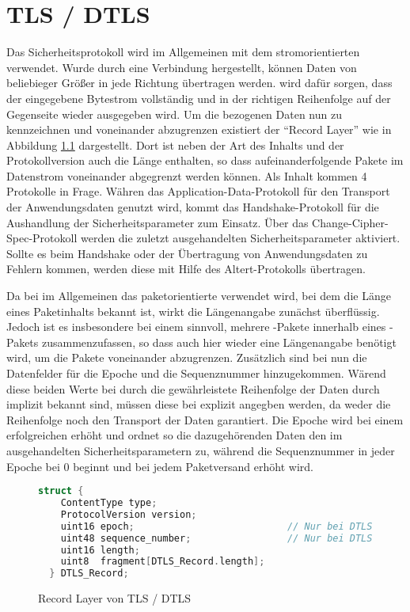 \chapter{TLS / DTLS}

Das Sicherheitsprotokoll  wird im Allgemeinen mit dem stromorientierten  verwendet.
Wurde durch  eine Verbindung hergestellt, können Daten von beliebieger Größer in jede Richtung
übertragen werden.  wird dafür sorgen, dass der eingegebene Bytestrom vollständig und in der
richtigen Reihenfolge auf der Gegenseite wieder ausgegeben wird. Um die  bezogenen Daten nun
zu kennzeichnen und voneinander abzugrenzen existiert der "`Record Layer"' wie in Abbildung \ref{fig:recordlayer}
dargestellt. Dort ist neben der Art des Inhalts und der Protokollversion auch die Länge enthalten, so dass
aufeinanderfolgende Pakete im Datenstrom voneinander abgegrenzt werden können. Als Inhalt kommen 4 Protokolle
in Frage. Währen das Application-Data-Protokoll für den Transport der Anwendungsdaten genutzt wird, kommt
das Handshake-Protokoll für die Aushandlung der Sicherheitsparameter zum Einsatz. Über das Change-Cipher-Spec-Protokoll
werden die zuletzt ausgehandelten Sicherheitsparameter aktiviert. Sollte es beim Handshake oder der Übertragung
von Anwendungsdaten zu Fehlern kommen, werden diese mit Hilfe des Altert-Protokolls übertragen.

Da bei  im Allgemeinen das paketorientierte  verwendet wird, bei dem die Länge eines
Paketinhalts bekannt ist, wirkt die Längenangabe zunächst überflüssig. Jedoch ist es insbesondere bei einem
 sinnvoll, mehrere -Pakete innerhalb eines -Pakets zusammenzufassen,
so dass auch hier wieder eine Längenangabe benötigt wird, um die Pakete voneinander abzugrenzen.
Zusätzlich sind bei  nun die Datenfelder für die Epoche und die Sequenznummer hinzugekommen.
Wärend diese beiden Werte bei  durch die gewährleistete Reihenfolge der Daten durch 
implizit bekannt sind, müssen diese bei  explizit angegben werden, da  weder die
Reihenfolge noch den Transport der Daten garantiert. Die Epoche wird bei einem erfolgreichen 
erhöht und ordnet so die dazugehörenden Daten den im  ausgehandelten Sicherheitsparametern zu,
während die Sequenznummer in jeder Epoche bei 0 beginnt und bei jedem Paketversand erhöht wird.

\begin{figure}[ht]
  \centering
  \begin{lstlisting}[language=c]
  struct {
    ContentType type;
    ProtocolVersion version;
    uint16 epoch;                           // Nur bei DTLS
    uint48 sequence_number;                 // Nur bei DTLS
    uint16 length;
    uint8  fragment[DTLS_Record.length];
  } DTLS_Record;
  \end{lstlisting}
  \caption{Record Layer von TLS / DTLS}
  \label{fig:recordlayer}
\end{figure}

